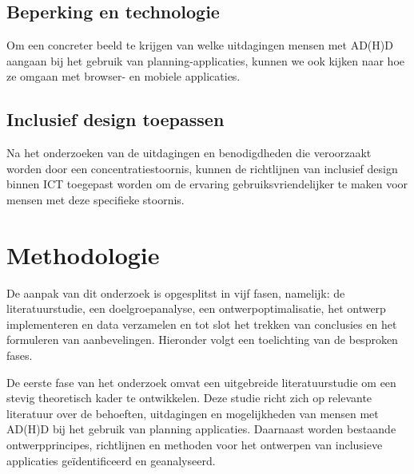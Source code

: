 \subsection{Beperking en technologie} %
Om een concreter beeld te krijgen van welke uitdagingen mensen met AD(H)D aangaan bij het gebruik van planning-applicaties, kunnen we ook kijken naar hoe ze omgaan met browser- \autocite{Harrysson2004} en mobiele \autocite{Rapp2019} applicaties. \newline

\subsection{Inclusief design toepassen} %
Na het onderzoeken van de uitdagingen en benodigdheden die veroorzaakt worden door een concentratiestoornis, kunnen de richtlijnen van inclusief design binnen ICT \autocite{Gulliksen2004, Nicolle2001, Roessvoll2013} toegepast worden om de ervaring gebruiksvriendelijker te maken voor mensen met deze specifieke stoornis.



\section{Methodologie}%
\label{sec:methodologie}

De aanpak van dit onderzoek is opgesplitst in vijf fasen, namelijk: de literatuurstudie, een doelgroepanalyse, een ontwerpoptimalisatie, het ontwerp implementeren en data verzamelen en tot slot het trekken van conclusies en het formuleren van aanbevelingen. Hieronder volgt een toelichting van de besproken fases. \newline 


De eerste fase van het onderzoek omvat een uitgebreide literatuurstudie om een stevig theoretisch kader te ontwikkelen. Deze studie richt zich op relevante literatuur over de behoeften, uitdagingen en mogelijkheden van mensen met AD(H)D bij het gebruik van planning applicaties. Daarnaast worden bestaande ontwerpprincipes, richtlijnen en methoden voor het ontwerpen van inclusieve applicaties geïdentificeerd en geanalyseerd. \newline 

